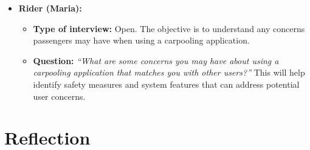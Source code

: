 \documentclass[12pt,letterpaper]{article}
\begin{document}
\begin{itemize}
    \item \textbf{Rider (Maria):}
    \begin{itemize}
        \item \textbf{Type of interview:} Open. The objective is to understand any concerns passengers may have when using a carpooling application.
        \item \textbf{Question:} \textit{“What are some concerns you may have about using a carpooling application that matches you with other users?”}  
        This will help identify safety measures and system features that can address potential user concerns.
    \end{itemize}
\end{itemize}

\newpage
\section{Reflection}
\end{document}
